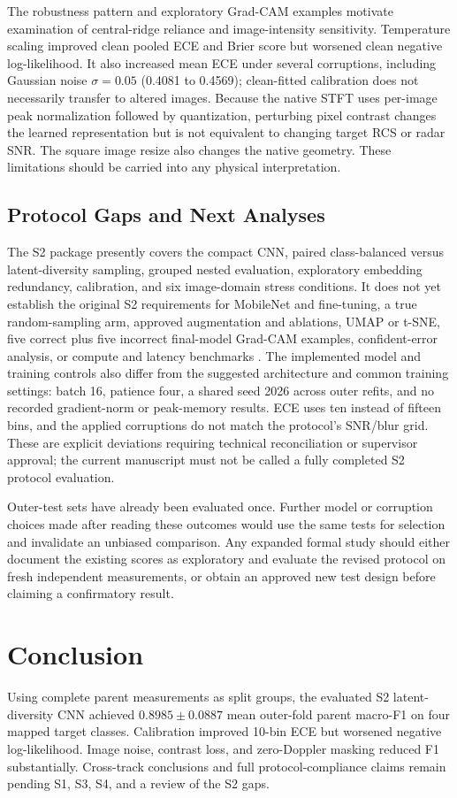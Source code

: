 \IfFileExists{IEEEtran.cls}{\ieeetrue\documentclass[conference]{IEEEtran}}{\ieeefalse\documentclass[10pt,twocolumn,letterpaper]{article}}
\begin{document}
The robustness pattern and exploratory Grad-CAM examples motivate examination of central-ridge reliance and image-intensity sensitivity. Temperature scaling improved clean pooled ECE and Brier score but worsened clean negative log-likelihood. It also increased mean ECE under several corruptions, including Gaussian noise $\sigma=0.05$ (0.4081 to 0.4569); clean-fitted calibration does not necessarily transfer to altered images. Because the native STFT uses per-image peak normalization followed by quantization, perturbing pixel contrast changes the learned representation but is not equivalent to changing target RCS or radar SNR. The square image resize also changes the native geometry. These limitations should be carried into any physical interpretation.

\subsection{Protocol Gaps and Next Analyses}
The S2 package presently covers the compact CNN, paired class-balanced versus latent-diversity sampling, grouped nested evaluation, exploratory embedding redundancy, calibration, and six image-domain stress conditions. It does not yet establish the original S2 requirements for MobileNet and fine-tuning, a true random-sampling arm, approved augmentation and ablations, UMAP or t-SNE, five correct plus five incorrect final-model Grad-CAM examples, confident-error analysis, or compute and latency benchmarks \cite{courseprotocol}. The implemented model and training controls also differ from the suggested architecture and common training settings: batch 16, patience four, a shared seed 2026 across outer refits, and no recorded gradient-norm or peak-memory results. ECE uses ten instead of fifteen bins, and the applied corruptions do not match the protocol's SNR/blur grid. These are explicit deviations requiring technical reconciliation or supervisor approval; the current manuscript must not be called a fully completed S2 protocol evaluation.

Outer-test sets have already been evaluated once. Further model or corruption choices made after reading these outcomes would use the same tests for selection and invalidate an unbiased comparison. Any expanded formal study should either document the existing scores as exploratory and evaluate the revised protocol on fresh independent measurements, or obtain an approved new test design before claiming a confirmatory result.

\section{Conclusion}
Using complete parent measurements as split groups, the evaluated S2 latent-diversity CNN achieved $0.8985\pm0.0887$ mean outer-fold parent macro-F1 on four mapped target classes. Calibration improved 10-bin ECE but worsened negative log-likelihood. Image noise, contrast loss, and zero-Doppler masking reduced F1 substantially. Cross-track conclusions and full protocol-compliance claims remain pending S1, S3, S4, and a review of the S2 gaps.
\end{document}
